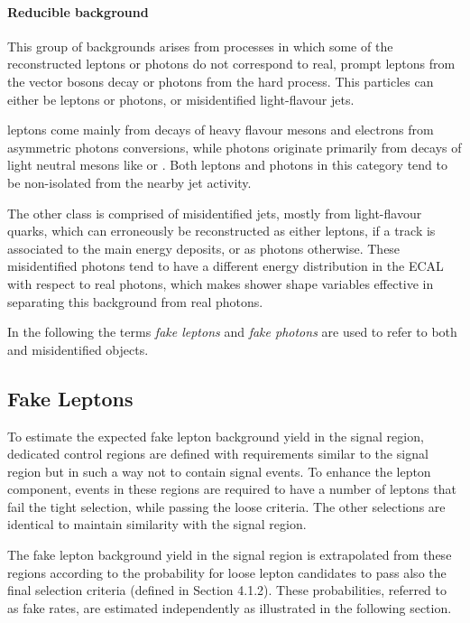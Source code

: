 \paragraph{Reducible background\\}
This group of backgrounds arises from processes in which some of the reconstructed leptons or photons do not correspond to real, prompt leptons from the vector bosons decay or photons from the hard process.
This particles can either be \nonprompt leptons or photons, or misidentified light-flavour jets.

\Nonprompt leptons come mainly from decays of heavy flavour mesons and electrons from asymmetric photons conversions,
while \nonprompt photons originate primarily from decays of light neutral mesons like \PGpz or \PGh.
Both leptons and photons in this category tend to be non-isolated from the nearby jet activity.

The other class is comprised of misidentified jets, mostly from light-flavour quarks, which can erroneously be reconstructed as either leptons,
if a track is associated to the main energy deposits, or as photons otherwise.
These misidentified photons tend to have a different energy distribution in the ECAL with respect to real photons,
which makes shower shape variables effective in separating this background from real photons.

In the following the terms \textit{fake leptons} and \textit{fake photons} are used to refer to both \nonprompt and misidentified objects.

\subsection{Fake Leptons}
\label{sec:fake_leptons}
To estimate the expected fake lepton background yield in the signal region,
dedicated control regions are defined with requirements similar to the signal region but in such a way not to contain signal events.
To enhance the \nonprompt lepton component, events in these regions are required to
have a number of leptons that fail the tight selection, while passing the loose criteria.
The other selections are identical to maintain similarity with the signal region.

The fake lepton background yield in the signal region is extrapolated from these regions
according to the probability for loose lepton candidates to pass also the final selection criteria (defined in Section 4.1.2).
These probabilities, referred to as fake rates, are estimated independently as illustrated in the following section.

